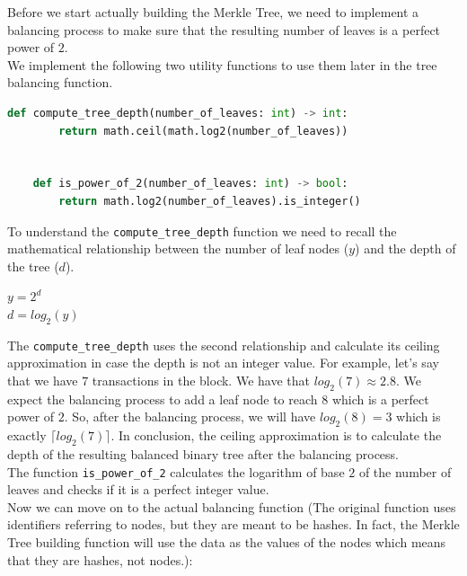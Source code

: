 \documentclass{scrbook}
\begin{document}
Before we start actually building the Merkle Tree, we need to implement a balancing process to make sure that the resulting number of leaves is a perfect power of $2$. \\

We implement the following two utility functions to use them later in the tree balancing function.

\begin{lstlisting}[language=Python, caption={Utility functions}]
    def compute_tree_depth(number_of_leaves: int) -> int:
        return math.ceil(math.log2(number_of_leaves))
    
    
    def is_power_of_2(number_of_leaves: int) -> bool:
        return math.log2(number_of_leaves).is_integer()
\end{lstlisting}

To understand the \texttt{compute\_tree\_depth} function we need to recall the mathematical relationship between the number of leaf nodes ($y$) and the depth of the tree ($d$).

\begin{center}
$y = 2^d$ \\
$d = log_2(y)$
\end{center}

The \texttt{compute\_tree\_depth} uses the second relationship and calculate its ceiling approximation in case the depth is not an integer value. For example, let's say that we have $7$ transactions in the block. We have that $log_2(7) \approx 2.8$. We expect the balancing process to add a leaf node to reach $8$ which is a perfect power of $2$. So, after the balancing process, we will have $log_2(8) = 3$ which is exactly $\lceil log_2(7) \rceil$. In conclusion, the ceiling approximation is to calculate the depth of the resulting balanced binary tree after the balancing process. \\

The function \texttt{is\_power\_of\_2} calculates the logarithm of base $2$ of the number of leaves and checks if it is a perfect integer value. \\

Now we can move on to the actual balancing function (The original function uses identifiers referring to nodes, but they are meant to be hashes. In fact, the Merkle Tree building function will use the data as the values of the nodes which means that they are hashes, not nodes.):
\end{document}
